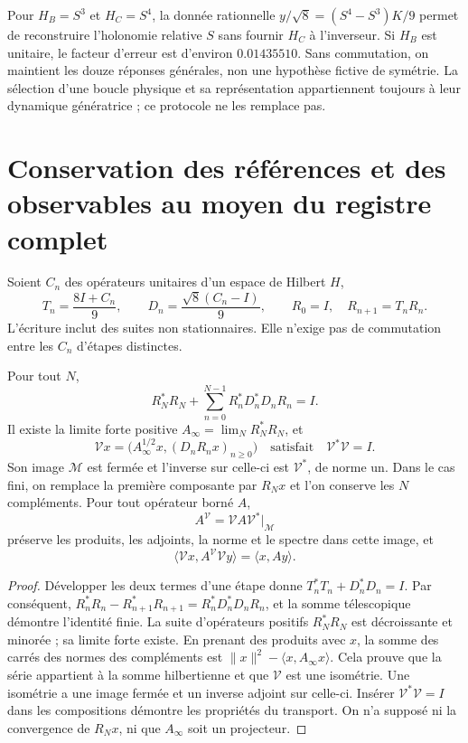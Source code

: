 Pour \(H_B=S^3\) et \(H_C=S^4\), la donnée rationnelle
\(y/\sqrt8=(S^4-S^3)K/9\) permet de reconstruire l’holonomie relative
\(S\) sans fournir \(H_C\) à l’inverseur. Si \(H_B\) est
unitaire, le facteur d’erreur est d’environ \(0.01435510\). Sans
commutation, on maintient les douze réponses générales, non une hypothèse
fictive de symétrie. La sélection d’une boucle physique et sa représentation
appartiennent toujours à leur dynamique génératrice ; ce protocole ne les
remplace pas.

\section{Conservation des références et des observables au moyen du registre complet}
\label{x_reciprocidad:lib01:memoria-completa}

Soient \(C_n\) des opérateurs unitaires d'un espace de Hilbert \(H\),
\[
 T_n=\frac{8I+C_n}{9},\qquad
 D_n=\frac{\sqrt8(C_n-I)}9,\qquad
 R_0=I,\quad R_{n+1}=T_nR_n.
\]
L'écriture inclut des suites non stationnaires. Elle n'exige pas de commutation entre les \(C_n\) d'étapes distinctes.

\begin{theorem}
\label{x_reciprocidad:lib01:isometria}
Pour tout \(N\),
\[
 R_N^*R_N+\sum_{n=0}^{N-1}R_n^*D_n^*D_nR_n=I.
\]
Il existe la limite forte positive \(A_\infty=\lim_N R_N^*R_N\), et
\begin{equation}
 \mathcal Vx=
 \bigl(A_\infty^{1/2}x,(D_nR_nx)_{n\geq0}\bigr)
 \quad\text{satisfait}\quad\mathcal V^*\mathcal V=I.
 \label{x_reciprocidad:lib01:V-infinita}
\end{equation}
Son image \(\mathcal M\) est fermée et l'inverse sur celle-ci est \(\mathcal V^*\), de norme un. Dans le cas fini, on remplace la première composante par \(R_Nx\) et l'on conserve les \(N\) compléments. Pour tout opérateur borné \(A\),
\[
 A^{\mathcal V}=\mathcal VA\mathcal V^*\big|_{\mathcal M}
\]
préserve les produits, les adjoints, la norme et le spectre dans cette image, et
\[
 \langle\mathcal Vx,A^{\mathcal V}\mathcal Vy\rangle
 =\langle x,Ay\rangle.
\]
\end{theorem}
\begin{proof}
Développer les deux termes d’une étape donne
\(T_n^*T_n+D_n^*D_n=I\). Par conséquent,
\(R_n^*R_n-R_{n+1}^*R_{n+1}=R_n^*D_n^*D_nR_n\), et la somme
télescopique démontre l’identité finie. La suite d’opérateurs
positifs \(R_N^*R_N\) est décroissante et minorée ; sa
limite forte existe. En prenant des produits avec \(x\), la somme des
carrés des normes des compléments est
\(\|x\|^2-\langle x,A_\infty x\rangle\). Cela prouve que la
série appartient à la somme hilbertienne et que \(\mathcal V\) est une
isométrie. Une isométrie a une image fermée et un inverse adjoint sur celle-ci.
Insérer \(\mathcal V^*\mathcal V=I\) dans les compositions démontre
les propriétés du transport. On n’a supposé ni la convergence de
\(R_Nx\), ni que \(A_\infty\) soit un projecteur.
\end{proof}

